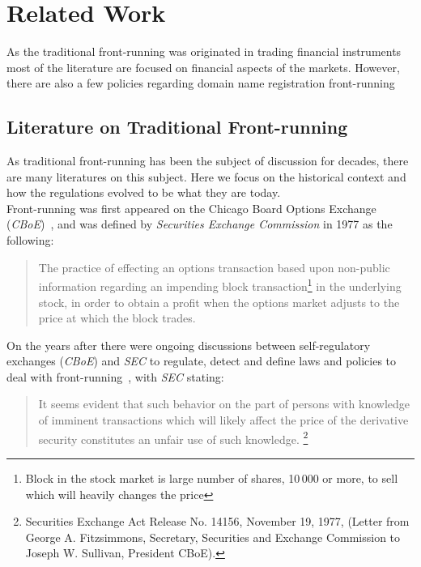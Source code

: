 \section{Related Work}
As the traditional front-running was originated in trading financial instruments most of the literature are focused on financial aspects of the markets.  However, there are also a few policies regarding domain name registration front-running~\cite{sac022en33:online}

\subsection{Literature on Traditional Front-running}
As traditional front-running has been the subject of discussion for decades, there are many literatures on this subject. Here we focus on the historical context and how the regulations evolved to be what they are today.\\
Front-running was first appeared on the Chicago Board Options Exchange (\textit{CBoE})~\cite{markham1988front}, and was defined by \textit{Securities Exchange Commission} in 1977 as the following:
\begin{quote}
The practice of effecting an options transaction based upon non-public information regarding an impending block transaction\footnote{Block in the stock market is large number of shares, 10\,000 or more, to sell which will heavily changes the price} in the underlying stock, in order to obtain a profit when the options market adjusts to the price at which the block trades. ~\cite{sec1978optionsmarket}
\end{quote} 


On the years after there were ongoing discussions between self-regulatory exchanges (\eg \textit{CBoE}) and  \textit{SEC} to regulate, detect and define laws and policies to deal with front-running~\cite{markham1988front}, with \textit{SEC} stating: 
\begin{quote}
It seems evident that such behavior on the part of persons with knowledge of imminent transactions which will likely affect the price of the derivative security constitutes an unfair use of such knowledge. \footnote{Securities Exchange Act Release No. 14156, November 19, 1977, (Letter from George A. Fitzsimmons, Secretary, Securities and Exchange Commission to Joseph W. Sullivan, President  CBoE).}
\end{quote} 

